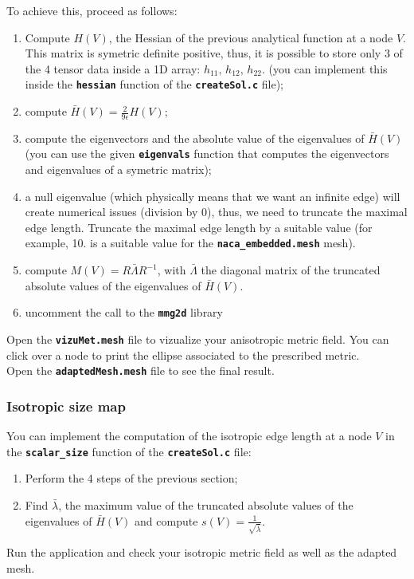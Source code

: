 \documentclass{article}
\newcommand{\ttb}[1]{\texttt{\textbf{#1}}}
\begin{document}
To achieve this, proceed as follows:

\begin{enumerate}
\item Compute $H(V)$, the Hessian of the previous analytical function
  at a node $V$. This matrix is symetric definite positive, thus, it
  is possible to store only 3 of the 4 tensor data inside a 1D array:
  $h_{11},\,h_{12},\,h_{22}$. (you can implement this
  inside the \ttb{hessian} function of the \ttb{createSol.c} file);
\item compute $\bar{H}(V) = \frac{2}{9\epsilon}H(V)$;
\item compute the eigenvectors and the absolute value of the
  eigenvalues of $\bar{H}(V)$ (you can use the given \ttb{eigenvals}
  function that computes the eigenvectors and eigenvalues of a
  symetric matrix);
\item a null eigenvalue (which physically means that we want an
  infinite edge) will create numerical issues (division by 0), thus, we
  need to truncate the maximal edge length. Truncate the maximal edge
  length by a suitable value (for example, 10. is a suitable value for
  the \ttb{naca\_embedded.mesh} mesh).
\item compute $M(V) = R \bar{\Lambda} R^{-1}$, with
  $\bar{\Lambda}$ the diagonal matrix of the truncated absolute values
  of the eigenvalues of $\bar{H}(V)$.
\item uncomment the call to the \ttb{mmg2d} library
\end{enumerate}

Open the \ttb{vizuMet.mesh} file to vizualize your anisotropic metric field.
You can click over a node to print the ellipse associated to the prescribed metric.\\

Open the \ttb{adaptedMesh.mesh} file to see the final result.

\subsubsection{Isotropic size map}
You can implement the computation of the isotropic edge length at a
node $V$ in the \ttb{scalar\_size} function of the \ttb{createSol.c}
file:

\begin{enumerate}
\item Perform the 4 steps of the previous section;
\item Find $\bar{\lambda}$, the maximum value of the truncated absolute values
  of the eigenvalues of $\bar{H}(V)$ and compute
  $ s(V) = \frac{1}{\sqrt{\bar{\lambda}}}$.
\end{enumerate}
Run the application and check your isotropic metric
field as well as the adapted mesh.\\
\end{document}
